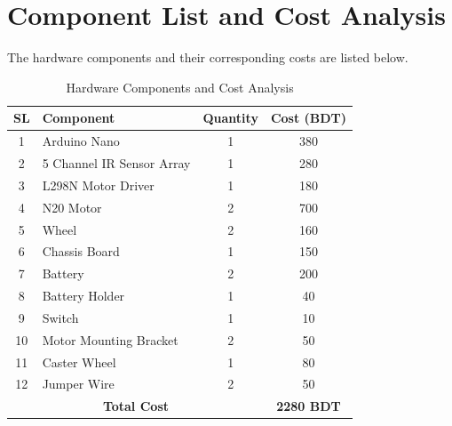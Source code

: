 \documentclass[12pt,a4paper,oneside]{report}
\begin{document}
\section{Component List and Cost Analysis}

The hardware components and their corresponding costs are listed below.


\begin{table}[H]
\centering
\caption{Hardware Components and Cost Analysis}

\begin{tabular}{|c|l|c|c|}
\hline

\textbf{SL} &
\textbf{Component} &
\textbf{Quantity} &
\textbf{Cost (BDT)} \\

\hline

1 & Arduino Nano & 1 & 380 \\

2 & 5 Channel IR Sensor Array & 1 & 280 \\

3 & L298N Motor Driver & 1 & 180 \\

4 & N20 Motor & 2 & 700 \\

5 & Wheel & 2 & 160 \\

6 & Chassis Board & 1 & 150 \\

7 & Battery & 2 & 200 \\

8 & Battery Holder & 1 & 40 \\

9 & Switch & 1 & 10 \\

10 & Motor Mounting Bracket & 2 & 50 \\

11 & Caster Wheel & 1 & 80 \\

12 & Jumper Wire & 2 & 50 \\

\hline

\multicolumn{3}{|c|}{\textbf{Total Cost}} &
\textbf{2280 BDT} \\

\hline

\end{tabular}

\end{table}
\end{document}
